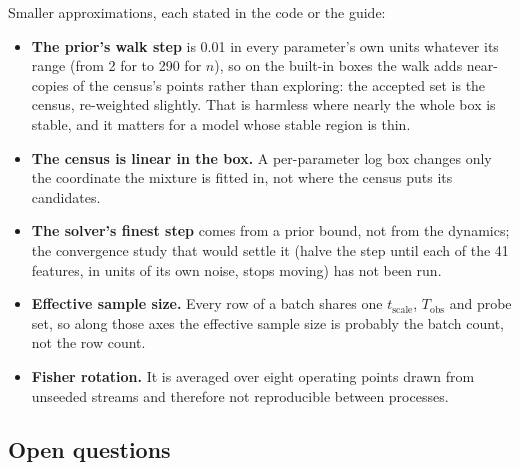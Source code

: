 \documentclass[10pt,a4paper]{article}
\newcommand{\code}[1]{\texttt{\detokenize{#1}}}
\newcommand{\Tobs}{T_{\mathrm{obs}}}
\newcommand{\tscale}{t_{\mathrm{scale}}}
\begin{document}
Smaller approximations, each stated in the code or the guide:
\begin{itemize}[leftmargin=1.4em,itemsep=1pt,topsep=2pt]
  \item \textbf{The prior's walk step} is 0.01 in every parameter's own units whatever its range (from 2 for \code{tau} to 290
        for $n$), so on the built-in boxes the walk adds near-copies of the census's points rather than exploring: the accepted
        set is the census, re-weighted slightly. That is harmless where nearly the whole box is stable, and it matters for a
        model whose stable region is thin.
  \item \textbf{The census is linear in the box.} A per-parameter log box changes only the coordinate the mixture is fitted in,
        not where the census puts its candidates.
  \item \textbf{The solver's finest step} comes from a prior bound, not from the dynamics; the convergence study that would
        settle it (halve the step until each of the 41 features, in units of its own noise, stops moving) has not been run.
  \item \textbf{Effective sample size.} Every row of a batch shares one $\tscale$, $\Tobs$ and probe set, so along those axes the
        effective sample size is probably the batch count, not the row count.
  \item \textbf{Fisher rotation.} It is averaged over eight operating points drawn from unseeded streams and therefore not
        reproducible between processes.
\end{itemize}

\subsection{Open questions}
\end{document}
